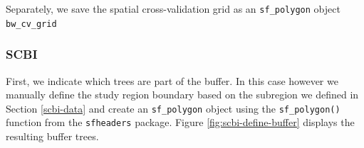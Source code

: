 \documentclass[12pt]{article}
\newenvironment{Shaded}{\begin{snugshade}}{\end{snugshade}}
\newcommand{\DataTypeTok}[1]{\textcolor[rgb]{0.13,0.29,0.53}{#1}}
\newcommand{\DecValTok}[1]{\textcolor[rgb]{0.00,0.00,0.81}{#1}}
\newcommand{\FloatTok}[1]{\textcolor[rgb]{0.00,0.00,0.81}{#1}}
\newcommand{\KeywordTok}[1]{\textcolor[rgb]{0.13,0.29,0.53}{\textbf{#1}}}
\newcommand{\NormalTok}[1]{#1}
\newcommand{\OperatorTok}[1]{\textcolor[rgb]{0.81,0.36,0.00}{\textbf{#1}}}
\newcommand{\StringTok}[1]{\textcolor[rgb]{0.31,0.60,0.02}{#1}}
\begin{document}
Separately, we save the spatial cross-validation grid as an
\texttt{sf\_polygon} object \texttt{bw\_cv\_grid}

\begin{Shaded}
\end{Shaded}

\hypertarget{scbi-1}{%
\subsubsection{SCBI}\label{scbi-1}}

First, we indicate which trees are part of the buffer. In this case
however we manually define the study region boundary based on the
subregion we defined in Section \ref{scbi-data} and create an
\texttt{sf\_polygon} object using the \texttt{sf\_polygon()} function
from the \texttt{sfheaders} package. Figure \ref{fig:scbi-define-buffer}
displays the resulting buffer trees.

\begin{Shaded}
\end{Shaded}
\end{document}
